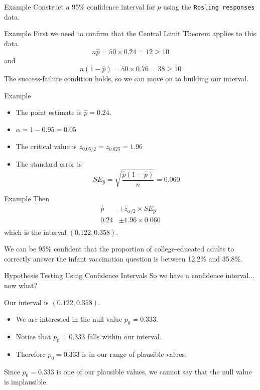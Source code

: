 \begin{frame}{Example}
    Construct a 95\% confidence interval for $p$ using the \texttt{Rosling responses} data.
\end{frame}

\begin{frame}{Example}
    First we need to confirm that the Central Limit Theorem applies to this data.
    \[
        n\hat{p} = 50\times0.24 = 12 \ge 10
    \]
    and 
    \[
        n(1-\hat{p}) = 50\times0.76 = 38 \ge 10
    \]
    The success-failure condition holds, so we can move on to building our interval.
\end{frame}

\begin{frame}{Example}
    \begin{itemize}
        \item The point estimate is $\hat{p}=0.24$.
        \item $\alpha = 1-0.95=0.05$
        \item The critical value is $z_{0.05/2} = z_{0.025} = 1.96$
        \item The standard error is
        \[
            SE_{\hat{p}} = \sqrt{\frac{\hat{p}(1-\hat{p})}{n}} = 0.060
        \]
    \end{itemize}
\end{frame}

\begin{frame}{Example}
    Then
    \begin{align*}
        \hat{p} &\pm z_{\alpha/2} \times SE_{\hat{p}} \\
        0.24 &\pm 1.96 \times 0.060 \\
    \end{align*}
    which is the interval $(0.122, 0.358)$.
    
    \vspace{12pt}We can be 95\% confident that the proportion of college-educated adults to correctly answer the infant vaccination question is between 12.2\% and 35.8\%. 
\end{frame}

\begin{frame}{Hypothesis Testing Using Confidence Intervals}
    So we have a confidence interval... now what?
    
    \vspace{12pt}Our interval is $(0.122, 0.358)$.
    \begin{itemize}
        \item We are interested in the null value $p_0 = 0.333$.
        \item Notice that $p_0=0.333$ falls within our interval.
        \item Therefore $p_0=0.333$ is in our range of plausible values.
    \end{itemize}
    Since $p_0=0.333$ is one of our plausible values, we cannot say that the null value is implausible.
\end{frame}

